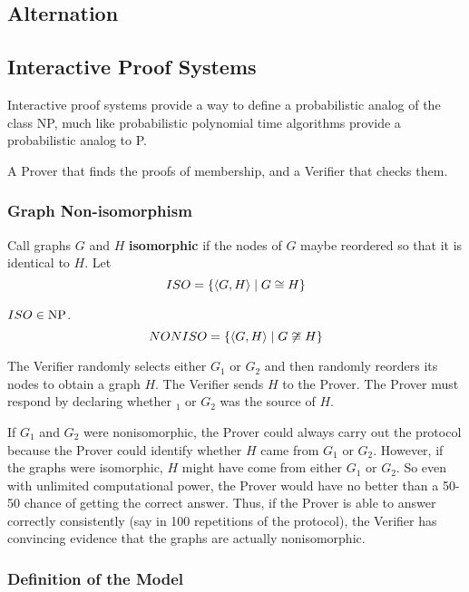 \subsection{Alternation}


\subsection{Interactive Proof Systems}

Interactive proof systems provide a way to define a probabilistic analog of the class NP, much like probabilistic polynomial time algorithms provide a probabilistic analog to P.

A Prover that finds the proofs of membership, and a Verifier that checks them.

\subsubsection{Graph Non-isomorphism}

Call graphs $G$ and $H$ \textbf{isomorphic} if the nodes of $G$ maybe reordered so that it is identical to $H$. Let
\[
ISO = \{\langle{G, H}\rangle \mid G \cong H\}
\]

$ISO \in \text{NP}$.
\[
NONISO = \{\langle{G, H}\rangle \mid G \not \cong H \}
\]

\begin{mdframed}
The Verifier randomly selects either $G_1$ or $G_2$ and then randomly reorders its nodes to obtain a graph $H$. The Verifier sends $H$ to the Prover. The Prover must respond by declaring whether $_1$ or $G_2$ was the source of $H$.

If $G_1$ and $G_2$ were nonisomorphic, the Prover could always carry out the protocol because the Prover could identify whether $H$ came from $G_1$ or $G_2$. However, if the graphs were isomorphic, $H$ might have come from either $G_1$ or $G_2$. So even with unlimited computational power, the Prover would have no better than a 50-50 chance of getting the correct answer. Thus, if the Prover is able to answer correctly consistently (say in 100 repetitions of the protocol), the Verifier has convincing evidence that the graphs are actually nonisomorphic.
\end{mdframed}

\subsubsection*{Definition of the Model}

